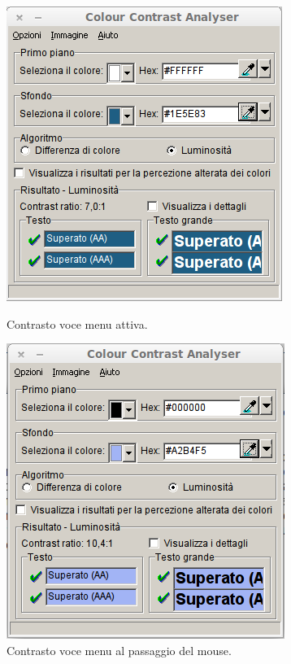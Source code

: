 \documentclass[a4paper]{article}
\begin{document}
\begin{figure}[htbp]
\begin{minipage}[b]{0.47\textwidth}
\vfill
\includegraphics[width=\textwidth]{test/contrasto/Test_Menu_Active.png}
\caption{\label{f_etichetta}Contrasto voce menu attiva.}
\end{minipage}
\hfill
\begin{minipage}[b]{0.47\textwidth}
\includegraphics[width=\textwidth]{test/contrasto/Test_Menu_Hover.png}
\caption{\label{f_etichetta}Contrasto voce menu al passaggio del mouse.}
\end{minipage}
\end{figure}
\end{document}
